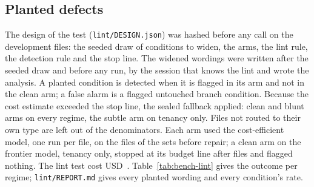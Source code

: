 \subsection{Planted defects}
\label{supp:bench-lint}

The design of the test (\texttt{lint/\allowbreak{}DESIGN.json}) was hashed before any call on the development files: the seeded draw of conditions to widen, the arms, the lint rule, the detection rule and the stop line. The widened wordings were written after the seeded draw and before any run, by the session that knows the lint and wrote the analysis. A planted condition is detected when it is flagged in its arm and not in the clean arm; a false alarm is a flagged untouched branch condition. Because the cost estimate exceeded the stop line, the sealed fallback applied: clean and blunt arms on every regime, the subtle arm on tenancy only. Files not routed to their own type are left out of the denominators. Each arm used the cost-efficient model, one run per file, on the \sfourdevLintFiles{} files of the sets before repair; a clean arm on the frontier model, tenancy only, stopped at its budget line after \sfourdevLintFrontierFiles{} files and flagged nothing. The lint test cost USD~\sfourdevLintSpend{}. Table~\ref{tab:bench-lint} gives the outcome per regime; \texttt{lint/\allowbreak{}REPORT.md} gives every planted wording and every condition's rate.

